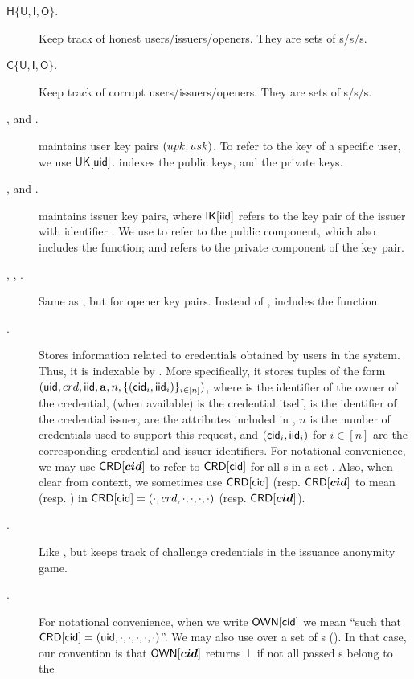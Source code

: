 \begin{description}
\item[$\mathsf{H}\lbrace\mathsf{U},\mathsf{I},\mathsf{O} \rbrace$.] Keep
  track of honest users/issuers/openers. They are sets of
  {\uid}s/{\iid}s/{\oid}s.
\item[$\mathsf{C}\lbrace\mathsf{U},\mathsf{I},\mathsf{O} \rbrace$.] Keep
  track of corrupt users/issuers/openers. They are sets of
  {\uid}s/{\iid}s/{\oid}s.    
\item[\UK, \PUBUK and \PRVUK.] \UK maintains user key pairs $(upk,usk)$. To
  refer to the key of a specific user, we use $\mathsf{UK}[\mathsf{uid}]$. \PUBUK indexes the
  public keys, and \PRVUK the private keys.
\item[\IK, \PUBIK and \PRVIK.] \IK maintains issuer key pairs, where
  $\mathsf{IK}[\mathsf{iid}]$ refers to the key pair of the issuer with identifier \iid. We
  use \PUBIK to refer to the public component, which also includes the \fissue
  function; and \PRVIK refers to the private component of the key pair.
\item[\OK, \PUBOK, \PRVOK.] Same as \IK, but for opener key pairs. Instead
  of \fissue, \OK includes the \finsp function.
\item[\CRED.] Stores information related to credentials obtained by users in
  the system. Thus, it is indexable by \cid. More specifically, it stores
  tuples of the form $(\mathsf{uid},crd,\mathsf{iid},\mathbf{a},n,\lbrace (\mathsf{cid}_i,\mathsf{iid}_i)
  \rbrace_{i \in [n]})$, where \uid is the identifier of the owner of the
  credential, \cred (when available) is the credential itself, \iid is the
  identifier of the credential issuer, \attrs are the attributes included in
  \cred, $n$ is the number of credentials used to support this request, and
  $(\mathsf{cid}_i,\mathsf{iid}_i)$ for $i \in [n]$ are the corresponding credential and issuer
  identifiers. For notational convenience, we may use $\mathsf{CRD}[\boldsymbol{cid}]$
  to refer to $\mathsf{CRD}[\mathsf{cid}]$ for all {\cid}s in a set \scid. Also, when clear
  from context, we sometimes use $\mathsf{CRD}[\mathsf{cid}]$ (resp. $\mathsf{CRD}[\boldsymbol{cid}]$ to
  mean \cred (resp. \scred) in $\mathsf{CRD}[\mathsf{cid}] = (\cdot,crd,\cdot,\cdot,
  \cdot,\cdot)$ (resp. $\mathsf{CRD}[\boldsymbol{cid}]$).
\item[\CCRED.] Like \CRED, but keeps track of challenge credentials in the
  issuance anonymity game.
\item[\OWNR.] For notational convenience, when we write $\mathsf{OWN}[\mathsf{cid}]$ we mean
  ``\uid such that $\mathsf{CRD}[\mathsf{cid}] = (\mathsf{uid},\cdot,\cdot,\cdot,\cdot,\cdot)$''. We
  may also use \OWNR over a set of {\cid}s (\scid). In that case, our convention
  is that $\mathsf{OWN}[\boldsymbol{cid}]$ returns $\bot$ if not all passed {\cid}s belong to the

\end{description}
